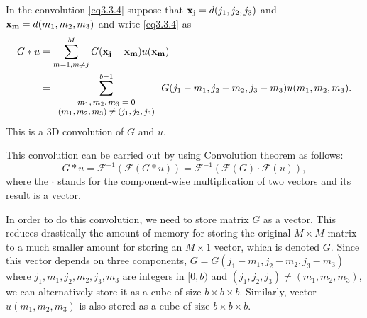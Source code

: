 \documentclass[12pt]{elsarticle}
\numberwithin{equation}{section}
\newcommand{\be}{\begin{equation}}
\newcommand{\ee}{\end{equation}}
\begin{document}
In the convolution \eqref{eq3.3.4} suppose that $\bold{x_j}=d(j_1,j_2,j_3)$ and $\bold{x_m}=d(m_1,m_2,m_3)$ and write \eqref{eq3.3.4} as
\begin{align}
	G*u &= \sum_{m=1, m \ne j}^M  G(\bold{x_j}-\bold{x_m})u(\bold{x_m})  \label{eq3.3.6} \\
		&= \sum_{{\footnotesize \begin{array}{c}
			m_1,m_2,m_3=0 \\
			(m_1,m_2,m_3) \ne (j_1,j_2,j_3)
		\end{array}}}^{b-1}
		G(j_1-m_1,j_2-m_2, j_3-m_3)u(m_1,m_2,m_3).  \label{eq3.3.7}
\end{align}
This is a 3D convolution of $G$ and $u$.

This convolution can be carried out by using Convolution theorem as follows:
\be \label{eq3.3.8}
	G*u=\mathcal{F}^{-1}(\mathcal{F}(G*u))=\mathcal{F}^{-1}(\mathcal{F}(G)\cdot \mathcal{F}(u)),
\ee
where the $\cdot$ stands for the component-wise multiplication of two vectors and its result is a vector.

In order to do this convolution, we need to store matrix $G$ as a vector. This reduces drastically the amount of memory for storing the original $M\times M$ matrix to a much smaller amount for storing an $M \times 1$ vector, which is denoted $G$. Since this vector depends on three components, $G=G(j_1-m_1,j_2-m_2, j_3-m_3)$ where $j_1, m_1, j_2, m_2, j_3, m_3$ are integers in $[0,b)$ and $(j_1,j_2,j_3) \ne (m_1,m_2,m_3)$, we can alternatively store it as a cube of size $b\times b\times b$. Similarly, vector $u(m_1,m_2,m_3)$ is also stored as a cube of size $b\times b\times b$.
\end{document}
